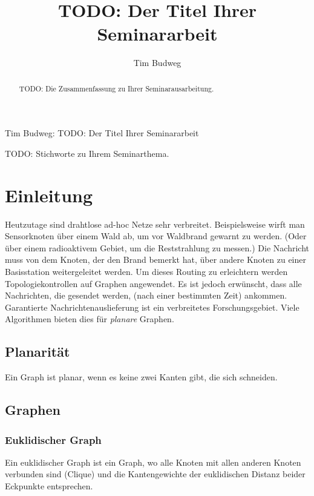 \documentclass[a4paper,twoside]{IEEEtran}
\newcommand{\seminarteilnehmer}{Tim Budweg}
\newcommand{\seminartitel}{TODO: Der Titel Ihrer Seminararbeit}
\begin{document}
\title{\seminartitel}
\author{\seminarteilnehmer}

%
{\seminarteilnehmer: \seminartitel}


\maketitle

\begin{abstract}
TODO: Die Zusammenfassung zu Ihrer Seminarausarbeitung.
\end{abstract}

\begin{IEEEkeywords}
TODO: Stichworte zu Ihrem Seminarthema.
\end{IEEEkeywords}


\section{Einleitung}
Heutzutage sind drahtlose ad-hoc Netze sehr verbreitet. Beispielsweise wirft man Sensorknoten über einem Wald ab, um vor Waldbrand gewarnt zu werden. (Oder über einem radioaktivem Gebiet, um die Reststrahlung zu messen.) Die Nachricht muss von dem Knoten, der den Brand bemerkt hat, über andere Knoten zu einer Basisstation weitergeleitet werden. Um dieses Routing zu erleichtern werden Topologiekontrollen auf Graphen angewendet. Es ist jedoch erwünscht, dass alle Nachrichten, die gesendet werden, (nach einer bestimmten Zeit) ankommen. Garantierte Nachrichtenauslieferung ist ein verbreitetes Forschungsgebiet. Viele Algorithmen bieten dies für \textit{planare} Graphen.

\subsection{Planarität}
Ein Graph ist planar, wenn es keine zwei Kanten gibt, die sich schneiden.

\subsection{Graphen}
\subsubsection{Euklidischer Graph}
Ein euklidischer Graph ist ein Graph, wo alle Knoten mit allen anderen Knoten verbunden sind (Clique) und die Kantengewichte der euklidischen Distanz beider Eckpunkte entsprechen.
\end{document}
